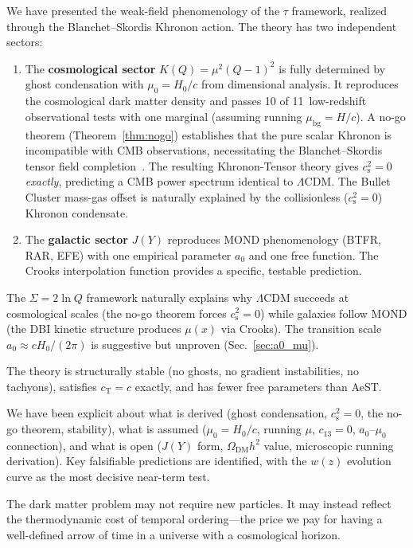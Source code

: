 \documentclass[prd,twocolumn,superscriptaddress,longbibliography,floatfix]{revtex4-2}
\newcommand{\tauasym}{\tau}
\newcommand{\cs}{c_{\mathrm{s}}}
\newcommand{\cT}{c_{\mathrm{T}}}
\begin{document}
We have presented the weak-field phenomenology of the $\tauasym$
framework, realized through the Blanchet--Skordis Khronon action.
The theory has two independent sectors:

\begin{enumerate}
\item The \textbf{cosmological sector} $K(Q) = \mu^2(Q-1)^2$
  is fully determined by ghost condensation with
  $\mu_0 = H_0/c$ from dimensional analysis.  It reproduces
  the cosmological dark matter density and passes 10 of
  11~low-redshift observational tests with one marginal
  (assuming running $\mu_{\mathrm{bg}} = H/c$).
  A no-go theorem (Theorem~\ref{thm:nogo}) establishes that
  the pure scalar Khronon is incompatible with CMB observations,
  necessitating the Blanchet--Skordis tensor field
  completion~\cite{BS2025}.  The resulting Khronon-Tensor theory
  gives $\cs^2 = 0$ \emph{exactly}, predicting a CMB power
  spectrum identical to $\Lambda$CDM.  The Bullet Cluster
  mass-gas offset is naturally explained by the collisionless
  ($\cs^2 = 0$) Khronon condensate.
\item The \textbf{galactic sector} $J(Y)$ reproduces MOND
  phenomenology (BTFR, RAR, EFE) with one empirical parameter
  $a_0$ and one free function.  The Crooks interpolation
  function provides a specific, testable prediction.
\end{enumerate}

The $\Sigma = 2\ln Q$ framework naturally explains why $\Lambda$CDM
succeeds at cosmological scales (the no-go theorem forces $\cs^2 = 0$)
while galaxies follow MOND (the DBI kinetic structure produces
$\mu(x)$ via Crooks).  The transition scale $a_0 \approx cH_0/(2\pi)$
is suggestive but unproven (Sec.~\ref{sec:a0_mu}).

The theory is structurally stable (no ghosts, no gradient
instabilities, no tachyons), satisfies $\cT = c$ exactly,
and has fewer free parameters than AeST.

We have been explicit about what is derived (ghost condensation,
$\cs^2 = 0$, the no-go theorem, stability), what is assumed
($\mu_0 = H_0/c$, running $\mu$, $c_{13} = 0$,
$a_0$--$\mu_0$ connection), and
what is open ($J(Y)$ form, $\Omega_{\mathrm{DM}}h^2$ value,
microscopic running derivation).  Key falsifiable
predictions are identified, with the $w(z)$ evolution
curve as the most decisive near-term test.

The dark matter problem may not require new particles.
It may instead reflect the thermodynamic cost of temporal
ordering---the price we pay for having a well-defined arrow
of time in a universe with a cosmological horizon.
\end{document}
